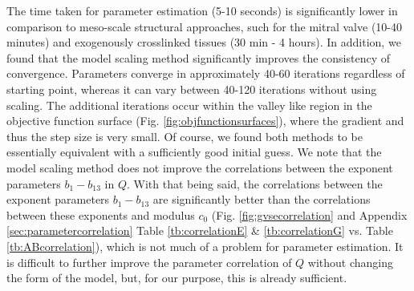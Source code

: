     The time taken for parameter estimation (5-10 seconds) is significantly lower in comparison to meso-scale structural approaches, such for the mitral valve \cite{zhang_meso_2016} (10-40 minutes) and exogenously crosslinked tissues \cite{zhang_modeling_2017}(30 min - 4 hours). In addition, we found that the model scaling method significantly improves the consistency of convergence. Parameters converge in approximately 40-60 iterations regardless of starting point, whereas it can vary between 40-120 iterations without using scaling. The additional iterations occur within the valley like region in the objective function surface (Fig. \ref{fig:objfunctionsurfaces}), where the gradient and thus the step size is very small. Of course, we found both methods to be essentially equivalent with a sufficiently good initial guess. We note that the model scaling method does not improve the correlations between the exponent parameters $b_1-b_{13}$ in $Q$. With that being said, the correlations between the exponent parameters $b_1-b_{13}$ are significantly better than the correlations between these exponents and modulus $c_0$ (Fig. \ref{fig:gvsecorrelation} and Appendix \ref{sec:parametercorrelation} Table \ref{tb:correlationE} \& \ref{tb:correlationG} vs. Table \ref{tb:ABcorrelation}), which is not much of a problem for parameter estimation. It is difficult to further improve the parameter correlation of $Q$ without changing the form of the model, but, for our purpose, this is already sufficient. 
    
